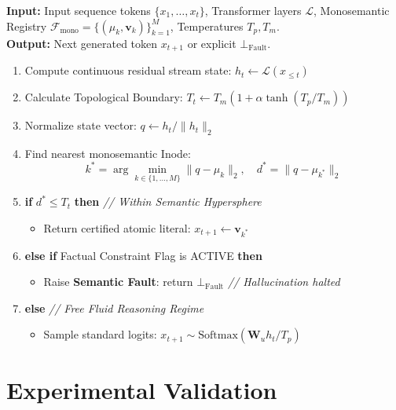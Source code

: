 \documentclass[11pt,a4paper]{article}
\theoremstyle{definition}
\begin{document}
\begin{tcolorbox}[title={\small \textbf{Algorithm 1: HySA Forward Execution and Metric Verification}\label{alg:hysa_decoding}}]
\footnotesize
\textbf{Input:} Input sequence tokens $\{x_1, \dots, x_t\}$, Transformer layers $\mathcal{L}$, Monosemantic Registry $\mathcal{F}_{\mathrm{mono}} = \{(\mu_k, \mathbf{v}_k)\}_{k=1}^M$, Temperatures $T_p, T_m$. \\
\textbf{Output:} Next generated token $x_{t+1}$ or explicit $\bot_{\mathrm{Fault}}$.
\begin{enumerate}[leftmargin=*, itemsep=1.0pt, topsep=1.0pt]
    \item Compute continuous residual stream state: $h_t \leftarrow \mathcal{L}(x_{\le t})$
    \item Calculate Topological Boundary: $T_t \leftarrow T_m \left( 1 + \alpha \tanh(T_p / T_m) \right)$
    \item Normalize state vector: $q \leftarrow h_t / \|h_t\|_2$
    \item Find nearest monosemantic Inode:
    $$k^* = \arg\min_{k \in \{1, \dots, M\}} \|q - \mu_k\|_2, \quad d^* = \|q - \mu_{k^*}\|_2$$
    \item \textbf{if} $d^* \le T_t$ \textbf{then} \hfill \textit{// Within Semantic Hypersphere}
    \begin{itemize}[leftmargin=12pt, itemsep=0.5pt]
        \item Return certified atomic literal: $x_{t+1} \leftarrow \mathbf{v}_{k^*}$
    \end{itemize}
    \item \textbf{else if} Factual Constraint Flag is ACTIVE \textbf{then}
    \begin{itemize}[leftmargin=12pt, itemsep=0.5pt]
        \item Raise \textbf{Semantic Fault}: return $\bot_{\mathrm{Fault}}$ \hfill \textit{// Hallucination halted}
    \end{itemize}
    \item \textbf{else} \hfill \textit{// Free Fluid Reasoning Regime}
    \begin{itemize}[leftmargin=12pt, itemsep=0.5pt]
        \item Sample standard logits: $x_{t+1} \sim \mathrm{Softmax}(\mathbf{W}_u h_t / T_p)$
    \end{itemize}
\end{enumerate}
\end{tcolorbox}

\section{Experimental Validation}
\end{document}
